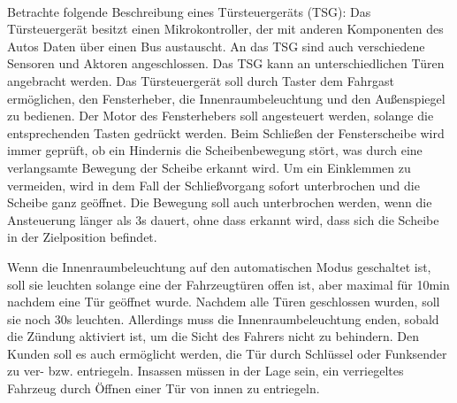 \newcommand{\printpraesenzlsg}{false}
\newcommand{\printloesungen}{false}
\newcommand{\printbewertungen}{false}
\newcommand{\blattnummer}{2}

\usepackage[utf8]{inputenc}
\usepackage{array}


\iforiginal{}

	
\\
Betrachte folgende Beschreibung eines Türsteuergeräts (TSG):
Das Türsteuergerät besitzt einen Mikrokontroller, der mit anderen Komponenten des Autos Daten über einen
Bus austauscht. An das TSG sind auch verschiedene Sensoren und Aktoren angeschlossen. Das TSG kann an
unterschiedlichen Türen angebracht werden. Das Türsteuergerät soll durch Taster dem Fahrgast ermöglichen,
den Fensterheber, die Innenraumbeleuchtung und den Außenspiegel zu bedienen.
Der Motor des Fensterhebers soll angesteuert werden, solange die entsprechenden Tasten gedrückt werden.
Beim Schließen der Fensterscheibe wird immer geprüft, ob ein Hindernis die Scheibenbewegung stört, was durch
eine verlangsamte Bewegung der Scheibe erkannt wird. Um ein Einklemmen zu vermeiden, wird in dem Fall der
Schließvorgang sofort unterbrochen und die Scheibe ganz geöffnet. Die Bewegung soll auch unterbrochen werden,
wenn die Ansteuerung länger als 3s dauert, ohne dass erkannt wird, dass sich die Scheibe in der Zielposition
befindet.

Wenn die Innenraumbeleuchtung auf den automatischen Modus geschaltet ist, soll sie leuchten solange eine
der Fahrzeugtüren offen ist, aber maximal für 10min nachdem eine Tür geöffnet wurde. Nachdem alle Türen
geschlossen wurden, soll sie noch 30s leuchten. Allerdings muss die Innenraumbeleuchtung enden, sobald die
Zündung aktiviert ist, um die Sicht des Fahrers nicht zu behindern. Den Kunden soll es auch ermöglicht werden,
die Tür durch Schlüssel oder Funksender zu ver- bzw. entriegeln. Insassen müssen in der Lage sein, ein
verriegeltes Fahrzeug durch Öffnen einer Tür von innen zu entriegeln.

